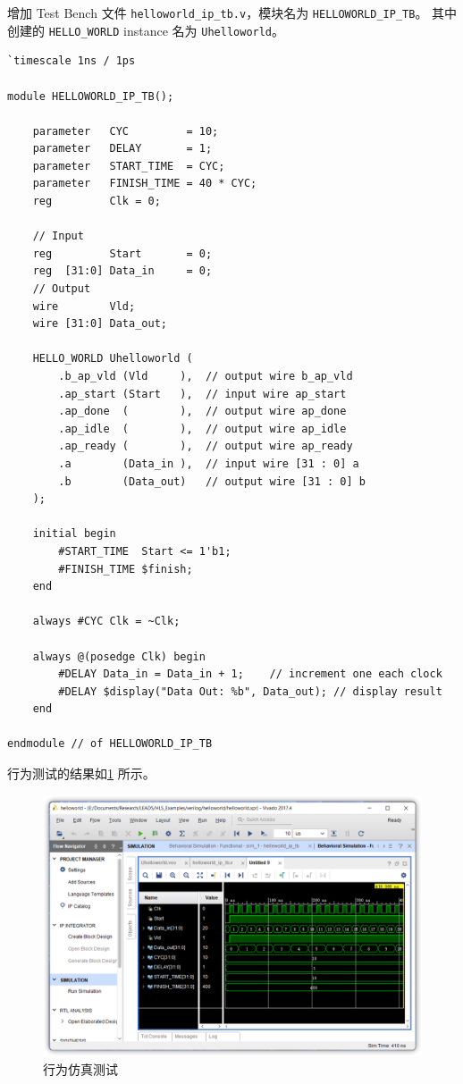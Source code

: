 \documentclass[English,Chinese,French,JP,TC,use boldface,simple name]{beaulivre}
\begin{document}
      增加 Test Bench 文件 \texttt{helloworld\_ip\_tb.v}，模块名为 \texttt{HELLOWORLD\_IP\_TB}。
      其中创建的 \texttt{HELLO\_WORLD} instance 名为 \texttt{Uhelloworld}。
      \begin{lstlisting}[style={v}, title={helloworld\_ip\_tb.v}]
`timescale 1ns / 1ps

module HELLOWORLD_IP_TB();

    parameter   CYC         = 10;
    parameter   DELAY       = 1;
    parameter   START_TIME  = CYC;
    parameter   FINISH_TIME = 40 * CYC;
    reg         Clk = 0;

    // Input
    reg         Start       = 0;
    reg  [31:0] Data_in     = 0;
    // Output
    wire        Vld;
    wire [31:0] Data_out;
        
    HELLO_WORLD Uhelloworld (
        .b_ap_vld (Vld     ),  // output wire b_ap_vld
        .ap_start (Start   ),  // input wire ap_start
        .ap_done  (        ),  // output wire ap_done
        .ap_idle  (        ),  // output wire ap_idle
        .ap_ready (        ),  // output wire ap_ready
        .a        (Data_in ),  // input wire [31 : 0] a
        .b        (Data_out)   // output wire [31 : 0] b
    );

    initial begin
        #START_TIME  Start <= 1'b1;
        #FINISH_TIME $finish;
    end
    
    always #CYC Clk = ~Clk;
    
    always @(posedge Clk) begin
        #DELAY Data_in = Data_in + 1;    // increment one each clock
        #DELAY $display("Data Out: %b", Data_out); // display result
    end
    
endmodule // of HELLOWORLD_IP_TB
      \end{lstlisting}

      行为测试的结果如\cref{fig:behavioral_sim} 所示。
      \begin{figure}[htbp]
        \centering
        \includegraphics[width=.8\linewidth]{win/helloworld/behavioral_sim.png}
        \caption{行为仿真测试}
        \label{fig:behavioral_sim}
      \end{figure}
\end{document}
